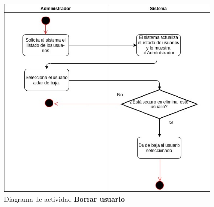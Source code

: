 \pagebreak
\begin{figure}[h]
\centering
\caption{Diagrama de actividad \textbf{Borrar usuario}}\label{fig:priorReq}
\includegraphics[width=1\textwidth, height=1.5\textwidth]{images/diag_act_borrar_usuario}
\end{figure}
